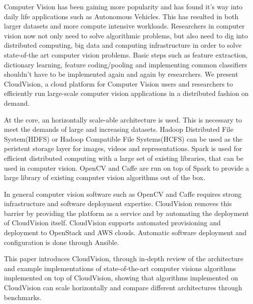
\begin{eabstract}
    Computer Vision has been gaining more popularity and has found it's way into daily
    life applications such as Autonomous Vehicles. This has resulted in both larger
    datasets and more compute intensive workloads. Researchers in computer vision now
    not only need to solve algorithmic problems, but also need to dig into distributed
    computing, big data and computing infrastructure in order to solve state-of-the art
    computer vision problems. Basic steps such as feature extraction, dictionary learning,
    feature coding/pooling and implementing common classifiers shouldn't have to be
    implemented again and again by researchers. We present CloudVision, a cloud platform
    for Computer Vision users and researchers to efficiently run large-scale computer
    vision applications in a distributed fashion on demand.

    At the core, an horizontally scale-able architecture is used. This is necessary to
    meet the demands of large and increasing datasets. Hadoop Distributed File System(HDFS)
    or Hadoop Compatible File Systems(HCFS) can be used as the peristent storage layer for images, videos
    and representations. Spark is used for efficient distributed computing
    with a large set of existing libraries, that can be used in computer vision. OpenCV and Caffe
    are run on top of Spark to provide a large library of existing computer vision algorithms
    out of the box.

    In general computer vision software such as OpenCV and Caffe requires strong
    infrastructure and software deployment expertise. CloudVision removes this barrier by
    providing the platform as a service and by automating the deployment of CloudVision
    itself. CloudVision supports automated provisioning and deployment to OpenStack and AWS
    clouds. Automatic software deployment and configuration is done through Ansible.

    This paper introduces CloudVision, through in-depth review of the architecture and
    example implementations of state-of-the-art computer visions algorithms implemented
    on top of CloudVision, showing that algorithms implemented on CloudVision can scale horizontally
    and compare different architectures through benchmarks.

\end{eabstract}


